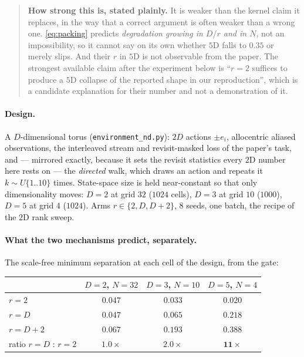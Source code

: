 \documentclass[11pt]{article}
\begin{document}
\begin{quote}\small
\textbf{How strong this is, stated plainly.} It is weaker than the kernel claim it
replaces, in the way that a correct argument is often weaker than a wrong one.
\eqref{eq:packing} predicts \emph{degradation growing in $D/r$ and in $N$}, not an
impossibility, so it cannot say on its own whether $5$D falls to $0.35$ or merely
slips. And their $r$ in $5$D is not observable from the paper. The strongest
available claim after the experiment below is ``$r=2$ suffices to produce a $5$D
collapse of the reported shape in our reproduction'', which is a candidate
explanation for their number and not a demonstration of it.
\end{quote}

\paragraph{Design.} A $D$-dimensional torus (\texttt{environment\_nd.py}): $2D$
actions $\pm e_i$, allocentric aliased observations, the interleaved stream and
revisit-masked loss of the paper's task, and --- mirrored exactly, because it sets
the revisit statistics every $2$D number here rests on --- the \emph{directed}
walk, which draws an action and repeats it $k\sim U\{1..10\}$ times. State-space
size is held near-constant so that only dimensionality moves: $D=2$ at grid $32$
($1024$ cells), $D=3$ at grid $10$ ($1000$), $D=5$ at grid $4$ ($1024$). Arms
$r \in \{2, D, D{+}2\}$, $8$ seeds, one batch, the recipe of the $2$D rank sweep.

\paragraph{What the two mechanisms predict, separately.} The scale-free minimum
separation at each cell of the design, from the gate:

\begin{center}\small
\begin{tabular}{lccc}
\toprule
 & $D=2$, $N{=}32$ & $D=3$, $N{=}10$ & $D=5$, $N{=}4$ \\
\midrule
$r=2$              & $0.047$ & $0.033$ & $0.020$ \\
$r=D$              & $0.047$ & $0.065$ & $0.218$ \\
$r=D{+}2$          & $0.067$ & $0.193$ & $0.388$ \\
\midrule
ratio $r{=}D$ : $r{=}2$ & $1.0\times$ & $2.0\times$ & $\mathbf{11\times}$ \\
\bottomrule
\end{tabular}
\end{center}
\end{document}
